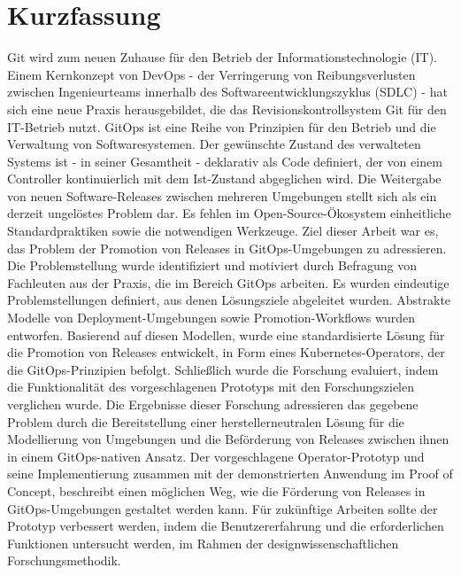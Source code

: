 \chapter{Kurzfassung}



Git wird zum neuen Zuhause für den Betrieb der Informationstechnologie (IT).
Einem Kernkonzept von DevOps
- der Verringerung von Reibungsverlusten zwischen Ingenieurteams innerhalb des Softwareentwicklungszyklus (SDLC) -
hat sich eine neue Praxis herausgebildet,
die das Revisionskontrollsystem Git für den IT-Betrieb nutzt.
GitOps ist eine Reihe von Prinzipien für den Betrieb und die Verwaltung von Softwaresystemen.
Der gewünschte Zustand des verwalteten Systems ist
- in seiner Gesamtheit -
deklarativ als Code definiert,
der von einem Controller kontinuierlich mit dem Ist-Zustand abgeglichen wird.
Die Weitergabe von neuen Software-Releases zwischen mehreren Umgebungen
stellt sich als ein derzeit ungelöstes Problem dar.
Es fehlen im Open-Source-Ökosystem einheitliche Standardpraktiken sowie die notwendigen Werkzeuge.
Ziel dieser Arbeit war es, das Problem der
Promotion von Releases in GitOps-Umgebungen zu adressieren.
Die Problemstellung wurde identifiziert und motiviert durch
Befragung von Fachleuten aus der Praxis, die im Bereich GitOps arbeiten.
Es wurden eindeutige Problemstellungen definiert, aus denen Lösungsziele abgeleitet wurden.
Abstrakte Modelle von Deployment-Umgebungen sowie Promotion-Workflows
wurden entworfen.
Basierend auf diesen Modellen,
wurde eine standardisierte Lösung für die Promotion von Releases
entwickelt,
in Form eines Kubernetes-Operators,
der die GitOps-Prinzipien befolgt.
Schließlich wurde die Forschung evaluiert, indem
die Funktionalität des vorgeschlagenen Prototyps
mit den Forschungszielen verglichen wurde.
Die Ergebnisse dieser Forschung
adressieren das gegebene Problem
durch die Bereitstellung einer herstellerneutralen Lösung
für die Modellierung von Umgebungen und die Beförderung von Releases zwischen ihnen
in einem GitOps-nativen Ansatz.
Der vorgeschlagene Operator-Prototyp und seine Implementierung zusammen mit
der demonstrierten Anwendung im Proof of Concept,
beschreibt einen möglichen Weg, wie die Förderung von Releases
in GitOps-Umgebungen gestaltet werden kann.
Für zukünftige Arbeiten sollte der Prototyp verbessert werden,
indem die Benutzererfahrung und die erforderlichen Funktionen untersucht werden,
im Rahmen der designwissenschaftlichen Forschungsmethodik.





















